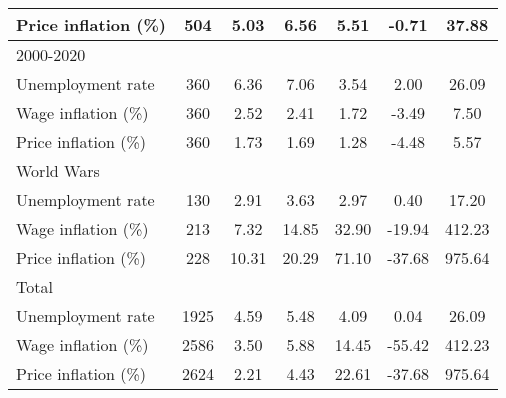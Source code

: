 \begin{table}[htbp]
\begin{tabular}{l*{1}{cccccc}}
Price inflation (\%)&         504&        5.03&        6.56&        5.51&       -0.71&       37.88\\
\hline
2000-2020           &            &            &            &            &            &            \\
Unemployment rate   &         360&        6.36&        7.06&        3.54&        2.00&       26.09\\
Wage inflation (\%) &         360&        2.52&        2.41&        1.72&       -3.49&        7.50\\
Price inflation (\%)&         360&        1.73&        1.69&        1.28&       -4.48&        5.57\\
\hline
World Wars          &            &            &            &            &            &            \\
Unemployment rate   &         130&        2.91&        3.63&        2.97&        0.40&       17.20\\
Wage inflation (\%) &         213&        7.32&       14.85&       32.90&      -19.94&      412.23\\
Price inflation (\%)&         228&       10.31&       20.29&       71.10&      -37.68&      975.64\\
\hline
Total               &            &            &            &            &            &            \\
Unemployment rate   &        1925&        4.59&        5.48&        4.09&        0.04&       26.09\\
Wage inflation (\%) &        2586&        3.50&        5.88&       14.45&      -55.42&      412.23\\
Price inflation (\%)&        2624&        2.21&        4.43&       22.61&      -37.68&      975.64\\
\hline\hline
\end{tabular}
\end{table}
